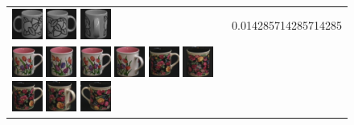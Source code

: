 \begin{figure}[tbp]
\begin{center}
\begin{tabular}{m{11cm} | m{3cm} |}
\includegraphics[width=1cm]{coil/beeld-51.eps}
\includegraphics[width=1cm]{coil/beeld-48.eps}
\includegraphics[width=1cm]{coil/beeld-50.eps}
& {\scriptsize 0.014285714285714285}
\\
\includegraphics[width=1cm]{coil/beeld-6.eps}
\includegraphics[width=1cm]{coil/beeld-8.eps}
\includegraphics[width=1cm]{coil/beeld-6.eps}
\includegraphics[width=1cm]{coil/beeld-10.eps}
\includegraphics[width=1cm]{coil/beeld-60.eps}
\includegraphics[width=1cm]{coil/beeld-62.eps}
\includegraphics[width=1cm]{coil/beeld-60.eps}
\includegraphics[width=1cm]{coil/beeld-64.eps}
\includegraphics[width=1cm]{coil/beeld-61.eps}

\end{tabular}
\end{center}
\end{figure}

